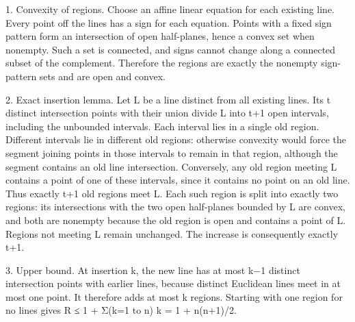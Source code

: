 \documentclass[11pt]{article}
\begin{document}
1. Convexity of regions. Choose an affine linear equation for each existing line. Every point off the lines has a sign for each equation. Points with a fixed sign pattern form an intersection of open half-planes, hence a convex set when nonempty. Such a set is connected, and signs cannot change along a connected subset of the complement. Therefore the regions are exactly the nonempty sign-pattern sets and are open and convex.

2. Exact insertion lemma. Let L be a line distinct from all existing lines. Its t distinct intersection points with their union divide L into t+1 open intervals, including the unbounded intervals. Each interval lies in a single old region. Different intervals lie in different old regions: otherwise convexity would force the segment joining points in those intervals to remain in that region, although the segment contains an old line intersection. Conversely, any old region meeting L contains a point of one of these intervals, since it contains no point on an old line. Thus exactly t+1 old regions meet L. Each such region is split into exactly two regions: its intersections with the two open half-planes bounded by L are convex, and both are nonempty because the old region is open and contains a point of L. Regions not meeting L remain unchanged. The increase is consequently exactly t+1.

3. Upper bound. At insertion k, the new line has at most k−1 distinct intersection points with earlier lines, because distinct Euclidean lines meet in at most one point. It therefore adds at most k regions. Starting with one region for no lines gives R ≤ 1 + Σ(k=1 to n) k = 1 + n(n+1)/2.
\end{document}
